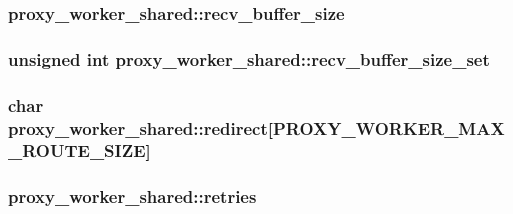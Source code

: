 \subsubsection[{\texorpdfstring{recv\+\_\+buffer\+\_\+size}{recv_buffer_size}}]{ proxy\+\_\+worker\+\_\+shared\+::recv\+\_\+buffer\+\_\+size}\hypertarget{structproxy__worker__shared_a2135614e512f343aa3b7d5d892529c13}{}\label{structproxy__worker__shared_a2135614e512f343aa3b7d5d892529c13}
\subsubsection[{\texorpdfstring{recv\+\_\+buffer\+\_\+size\+\_\+set}{recv_buffer_size_set}}]{\setlength{\rightskip}{0pt plus 5cm}unsigned {\bf int} proxy\+\_\+worker\+\_\+shared\+::recv\+\_\+buffer\+\_\+size\+\_\+set}\hypertarget{structproxy__worker__shared_ac962b943f4f638e25371ccf8cd06d0fa}{}\label{structproxy__worker__shared_ac962b943f4f638e25371ccf8cd06d0fa}
\subsubsection[{\texorpdfstring{redirect}{redirect}}]{\setlength{\rightskip}{0pt plus 5cm}char proxy\+\_\+worker\+\_\+shared\+::redirect\mbox{[}{\bf P\+R\+O\+X\+Y\+\_\+\+W\+O\+R\+K\+E\+R\+\_\+\+M\+A\+X\+\_\+\+R\+O\+U\+T\+E\+\_\+\+S\+I\+ZE}\mbox{]}}\hypertarget{structproxy__worker__shared_ab4bf20ff76b47f493f33d3f79b9f022d}{}\label{structproxy__worker__shared_ab4bf20ff76b47f493f33d3f79b9f022d}
\subsubsection[{\texorpdfstring{retries}{retries}}]{ proxy\+\_\+worker\+\_\+shared\+::retries}\hypertarget{structproxy__worker__shared_a734b2989e82cb44b69b0c433f7dfcff2}{}\label{structproxy__worker__shared_a734b2989e82cb44b69b0c433f7dfcff2}
